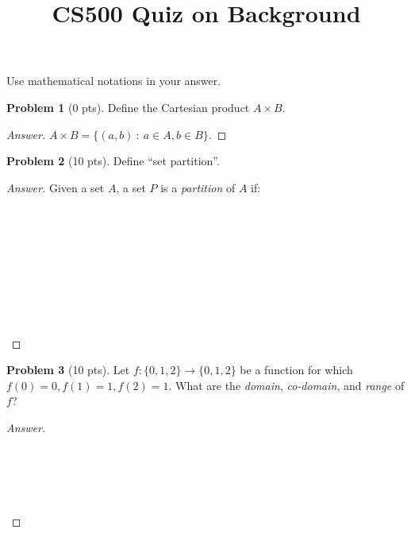 \documentclass[11pt,a4paper,oneside,microtype,nokorean]{oblivoir}
\theoremstyle{definition}
\newtheorem{problem}{Problem}
\begin{document}
\title{CS500 Quiz on Background}
\maketitle

\noindent Use mathematical notations in your answer.

\begin{problem}[0 pts]
  Define the Cartesian product $A \times B$.
\end{problem}
\begin{proof}[Answer]
  $A \times B = \{(a,b)~:~a \in A, b \in B\}$.
\end{proof}


\begin{problem}[10 pts]
  Define ``set partition''.
\end{problem}
\begin{proof}[Answer]
  Given a set $A$, a set $P$ is a \emph{partition} of $A$ if:
  \\
  \\
  \\
  \\
  \\
  \\
  \\
  \\
  \\
  \\
\end{proof}


\begin{problem}[10 pts]
  Let $f: \{0,1,2\} \to \{0,1,2\}$ be a function for which $f(0) = 0, f(1) = 1, f(2) = 1$.  What are
  the \emph{domain}, \emph{co-domain}, and \emph{range} of $f$?
\end{problem}
\begin{proof}[Answer]
  \ 
  \\
  \\
  \\
  \\
  \\
  \\
\end{proof}
\end{document}
